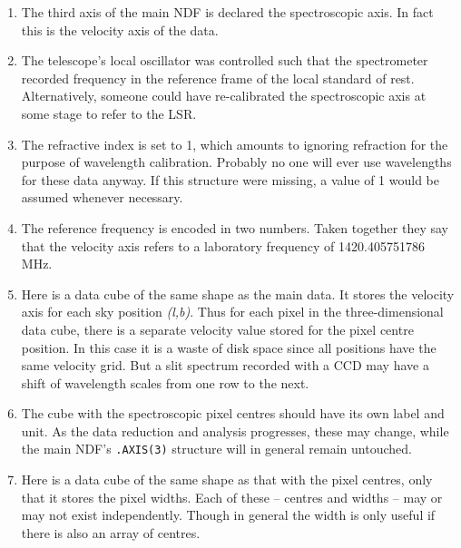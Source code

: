 \begin{enumerate}
\item The third axis of the main NDF is declared the spectroscopic axis.
   In fact this is the velocity axis of the data.

\item The telescope's local oscillator was controlled such that the
   spectrometer recorded frequency in the reference frame of the local
   standard of rest. Alternatively, someone could have re-calibrated the
   spectroscopic axis at some stage to refer to the LSR.

\item The refractive index is set to 1, which amounts to ignoring
   refraction for the purpose of wavelength calibration. Probably no one
   will ever use wavelengths for these data anyway. If this structure
   were missing, a value of 1 would be assumed whenever necessary.

\item The reference frequency is encoded in two numbers. Taken together
   they say that the velocity axis refers to a laboratory frequency of
   1420.405751786 MHz.

\item Here is a data cube of the same shape as the main data. It stores
   the velocity axis for each sky position {\it(l,b)}. Thus for each
   pixel in the three-dimensional data cube, there is a separate
   velocity value stored for the pixel centre position. In this case it
   is a waste of disk space since all positions have the same velocity
   grid. But a slit spectrum recorded with a CCD may have a shift of
   wavelength scales from one row to the next.

\item The cube with the spectroscopic pixel centres should have its own
   label and unit. As the data reduction and analysis progresses, these
   may change, while the main NDF's {\tt .AXIS(3)} structure will in
   general remain untouched.

\item Here is a data cube of the same shape as that with the pixel
   centres, only that it stores the pixel widths. Each of these --
   centres and widths -- may or may not exist independently. Though in
   general the width is only useful if there is also an array of
   centres.


\end{enumerate}
